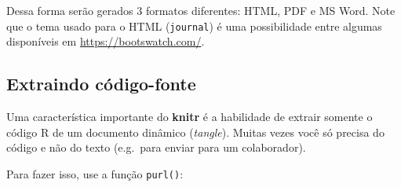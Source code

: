 \documentclass[10pt,a4paper]{book}
\newenvironment{Shaded}{\begin{snugshade}}{\end{snugshade}}
\newcommand{\KeywordTok}[1]{\textcolor[rgb]{0.13,0.29,0.53}{\textbf{#1}}}
\newcommand{\DecValTok}[1]{\textcolor[rgb]{0.00,0.00,0.81}{#1}}
\newcommand{\StringTok}[1]{\textcolor[rgb]{0.31,0.60,0.02}{#1}}
\newcommand{\OperatorTok}[1]{\textcolor[rgb]{0.81,0.36,0.00}{\textbf{#1}}}
\newcommand{\ErrorTok}[1]{\textcolor[rgb]{0.64,0.00,0.00}{\textbf{#1}}}
\newcommand{\NormalTok}[1]{#1}
\begin{document}
Dessa forma serão gerados 3 formatos diferentes: HTML, PDF e MS Word.
Note que o tema usado para o HTML (\texttt{journal}) é uma possibilidade
entre algumas disponíveis em \url{https://bootswatch.com/}.

\subsection{Extraindo código-fonte}\label{extraindo-cuxf3digo-fonte}

Uma característica importante do \textbf{knitr} é a habilidade de
extrair somente o código R de um documento dinâmico (\emph{tangle}).
Muitas vezes você só precisa do código e não do texto (e.g.~para enviar
para um colaborador).

Para fazer isso, use a função \texttt{purl()}:

\begin{Shaded}
\end{Shaded}
\end{document}
